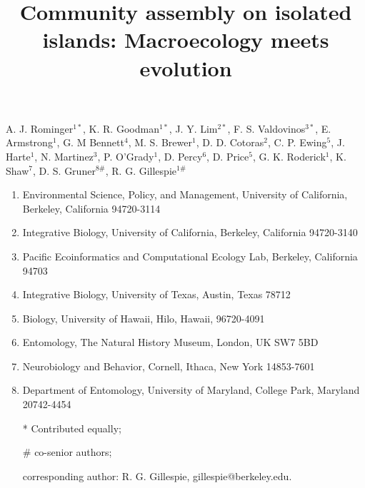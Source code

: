 \documentclass[12pt]{article}
\title{\vspace{-1em}Community assembly on isolated islands:
  Macroecology meets evolution}
\author{}
\date{}
\begin{document}
\baselineskip24pt
\maketitle 

\vspace{-4em}

A. J. Rominger$^{1*}$,
K. R. Goodman$^{1*}$, 
J. Y. Lim$^{2*}$, 
F. S. Valdovinos$^{3*}$, 
E. Armstrong$^1$,
G. M Bennett$^4$,
M. S. Brewer$^1$, 
D. D. Cotoras$^2$, 
C. P. Ewing$^5$, 
J. Harte$^1$,
N. Martinez$^3$,
P. O'Grady$^1$,
D. Percy$^6$,
D. Price$^5$,
G. K. Roderick$^1$,
K. Shaw$^7$,
D. S. Gruner$^{8\#}$,
R. G. Gillespie$^{1\#}$

\begin{enumerate}
\item Environmental Science, Policy, and Management, University of
  California, Berkeley, California 94720-3114
\item Integrative Biology, University of California, Berkeley,
  California 94720-3140
\item Pacific Ecoinformatics and Computational Ecology Lab, Berkeley,
  California 94703
\item Integrative Biology, University of Texas, Austin, Texas 78712
\item Biology, University of Hawaii, Hilo, Hawaii, 96720-4091
\item Entomology, The Natural History Museum, London, UK SW7 5BD
\item Neurobiology and Behavior, Cornell, Ithaca, New York 14853-7601
\item Department of Entomology, University of Maryland, College Park,
  Maryland 20742-4454
\item[*] Contributed equally;
\item[\#] co-senior authors; 
\item[] corresponding author: R. G. Gillespie, gillespie@berkeley.edu.
\end{enumerate}


\vspace{2em}
\end{document}
